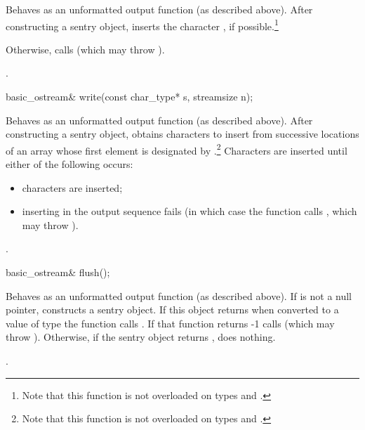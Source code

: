 \begin{itemdescr}
\pnum
\effects
Behaves as an unformatted output function (as described above).
After constructing a sentry
object, inserts
the character , if possible.\footnote{Note that this function is not overloaded on types
and
.}

\pnum
Otherwise, calls
(which may throw
).

\pnum
\returns
{}.
\end{itemdescr}

%
\begin{itemdecl}
basic_ostream& write(const char_type* s, streamsize n);
\end{itemdecl}

\begin{itemdescr}
\pnum
\effects
Behaves as an unformatted output function (as described above).  After constructing a sentry
object, obtains
characters to insert from
successive locations of an array whose first element is designated by
.\footnote{Note that this function is not overloaded on types
and
.}
Characters are inserted until either of the following occurs:
\begin{itemize}
\item
{} characters are inserted;
\item
inserting in the output sequence fails
(in which case the function calls
,
which may throw
).
\end{itemize}

\pnum
\returns
{}.
\end{itemdescr}

%
\begin{itemdecl}
basic_ostream& flush();
\end{itemdecl}

\begin{itemdescr}
\pnum
\effects Behaves as an unformatted output function (as described above).
If
is not a null pointer,
constructs a sentry object. If this object returns  when converted to a value of type  the function
calls
.
If that function returns -1
calls
(which may throw
).
Otherwise, if the sentry object returns , does nothing.

\pnum
\returns
{}.
\end{itemdescr}

